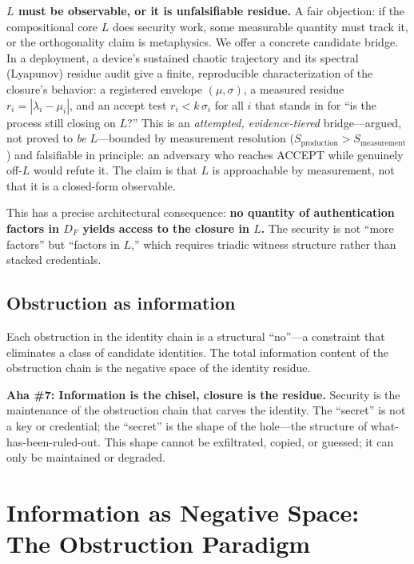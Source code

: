 \documentclass[11pt,a4paper]{article}
\theoremstyle{definition}
\theoremstyle{remark}
\newcommand{\aha}[2]{\medskip\textbf{Aha \##1: #2}}
\begin{document}
\medskip\noindent\textbf{$L$ must be observable, or it is unfalsifiable residue.} A fair objection: if the compositional core $L$ does security work, some measurable quantity must track it, or the orthogonality claim is metaphysics. We offer a concrete candidate bridge. In a deployment, a device's sustained chaotic trajectory and its spectral (Lyapunov) residue audit give a finite, reproducible characterization of the closure's behavior: a registered envelope $(\mu, \sigma)$, a measured residue $r_i = |\lambda_i - \mu_i|$, and an accept test $r_i < k\,\sigma_i$ for all $i$ that stands in for ``is the process still closing on $L$?'' This is an \emph{attempted, evidence-tiered} bridge---argued, not proved to \emph{be} $L$---bounded by measurement resolution ($S_\text{production} > S_\text{measurement}$) and falsifiable in principle: an adversary who reaches ACCEPT while genuinely off-$L$ would refute it. The claim is that $L$ is approachable by measurement, not that it is a closed-form observable.

This has a precise architectural consequence: \textbf{no quantity of authentication factors in $D_F$ yields access to the closure in $L$.} The security is not ``more factors'' but ``factors in $L$,'' which requires triadic witness structure rather than stacked credentials.

\subsection{Obstruction as information}

Each obstruction in the identity chain is a structural ``no''---a constraint that eliminates a class of candidate identities. The total information content of the obstruction chain is the negative space of the identity residue.

\aha{7}{Information is the chisel, closure is the residue.} Security is the maintenance of the obstruction chain that carves the identity. The ``secret'' is not a key or credential; the ``secret'' is the shape of the hole---the structure of what-has-been-ruled-out. This shape cannot be exfiltrated, copied, or guessed; it can only be maintained or degraded.

\section{Information as Negative Space: The Obstruction Paradigm}
\end{document}
